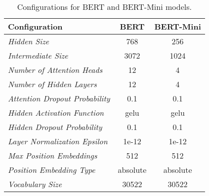 \begin{table}
%
\centering
\begin{tabular}{l|c|c}
\toprule
\textbf{Configuration}                    & \textbf{BERT}                     & \textbf{BERT-Mini}                     \\
\midrule
%
\textit{Hidden Size}                      & 768                                    & 256                               \\
\textit{Intermediate Size}                & 3072                                   & 1024                              \\
\textit{Number of Attention Heads}        & 12                                     & 4                                 \\
\textit{Number of Hidden Layers}          & 12                                     & 4                                 \\
\textit{Attention Dropout Probability}    & 0.1                                    & 0.1                               \\
\textit{Hidden Activation Function}       & gelu                                   & gelu                              \\
\textit{Hidden Dropout Probability}       & 0.1                                    & 0.1                               \\
\textit{Layer Normalization Epsilon}      & 1e-12                                  & 1e-12                             \\
\textit{Max Position Embeddings}          & 512                                    & 512                               \\
\textit{Position Embedding Type}          & absolute                               & absolute                          \\
\textit{Vocabulary Size}                  & 30522                                  & 30522                             \\
%
\bottomrule
\end{tabular}
\caption{Configurations for BERT and BERT-Mini models.}
%
\label{tab:bert_configs}
\end{table}